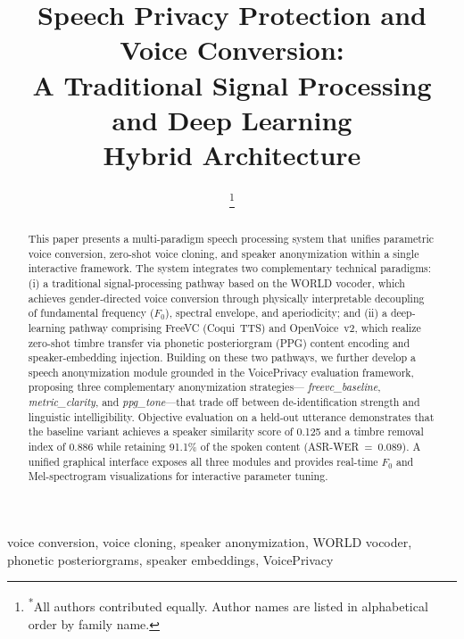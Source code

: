 \documentclass[conference]{IEEEtran}
\begin{document}
\title{Speech Privacy Protection and Voice Conversion:\\
A Traditional Signal Processing and Deep Learning\\
Hybrid Architecture}

\author{
\and
{}
\and
{}
\and
{}
\thanks{\textsuperscript{*}All authors contributed equally. Author names are listed in alphabetical order by family name.}
}

\maketitle

\begin{abstract}
This paper presents a multi-paradigm speech processing system that unifies
parametric voice conversion, zero-shot voice cloning, and speaker
anonymization within a single interactive framework.
The system integrates two complementary technical paradigms:
(i) a traditional signal-processing pathway based on the WORLD vocoder,
which achieves gender-directed voice conversion through physically
interpretable decoupling of fundamental frequency ($F_0$),
spectral envelope, and aperiodicity; and
(ii) a deep-learning pathway comprising FreeVC (Coqui~TTS) and
OpenVoice~v2, which realize zero-shot timbre transfer via
phonetic posteriorgram (PPG) content encoding and
speaker-embedding injection.
Building on these two pathways, we further develop a speech
anonymization module grounded in the VoicePrivacy evaluation
framework, proposing three complementary anonymization strategies---
\textit{freevc\_baseline}, \textit{metric\_clarity}, and
\textit{ppg\_tone}---that trade off between de-identification strength
and linguistic intelligibility.
Objective evaluation on a held-out utterance demonstrates that the
baseline variant achieves a speaker similarity score of 0.125 and a
timbre removal index of 0.886 while retaining 91.1\% of the
spoken content (ASR-WER~=~0.089).
A unified graphical interface exposes all three modules and provides
real-time $F_0$ and Mel-spectrogram visualizations for interactive
parameter tuning.
\end{abstract}

\begin{IEEEkeywords}
voice conversion, voice cloning, speaker anonymization, WORLD vocoder,
phonetic posteriorgrams, speaker embeddings, VoicePrivacy
\end{IEEEkeywords}
\end{document}
